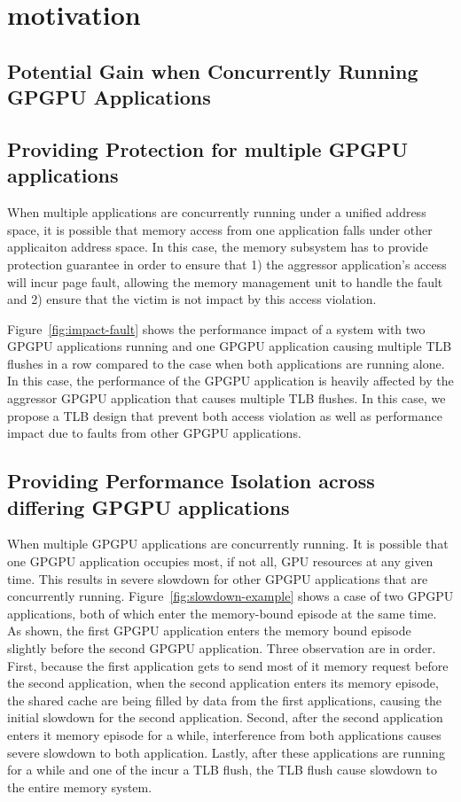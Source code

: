 \section{motivation}

\subsection{Potential Gain when Concurrently Running GPGPU Applications}



\subsection{Providing Protection for multiple GPGPU applications}

When multiple applications are concurrently running under a unified address
space, it is possible that memory access from one application falls under other
applicaiton address space. In this case, the memory subsystem has to provide
protection guarantee in order to ensure that 1) the aggressor application's
access will incur page fault, allowing the memory management unit to handle
the fault and 2) ensure that the victim is not impact by this access violation.

Figure~\ref{fig:impact-fault} shows the performance impact of a system with two
GPGPU applications running and one GPGPU application causing multiple TLB
flushes in a row compared to the case when both applications are running alone.
In this case, the performance of the GPGPU application is heavily affected by
the aggressor GPGPU application that causes multiple TLB flushes. In this case,
we propose a TLB design that prevent both access violation as well as performance
impact due to faults from other GPGPU applications.


\subsection{Providing Performance Isolation across differing GPGPU applications}

When multiple GPGPU applications are concurrently running. It is possible that
one GPGPU application occupies most, if not all, GPU resources at any given
time.  This results in severe slowdown for other GPGPU applications that are
concurrently running. Figure~\ref{fig:slowdown-example} shows a case of two
GPGPU applications, both of which enter the memory-bound episode at the same
time. As shown, the first GPGPU application enters the memory bound episode
slightly before the second GPGPU application. Three observation are in order. First,
because the first application gets to send most of it memory request before
the second application, when the second application enters its memory episode,
the shared cache are being filled by data from the first applications, causing
the initial slowdown for the second application. Second, after the second application
enters it memory episode for a while, interference from both applications causes
severe slowdown to both application. Lastly, after these applications are running
for a while and one of the incur a TLB flush, the TLB flush cause slowdown to the
entire memory system.


